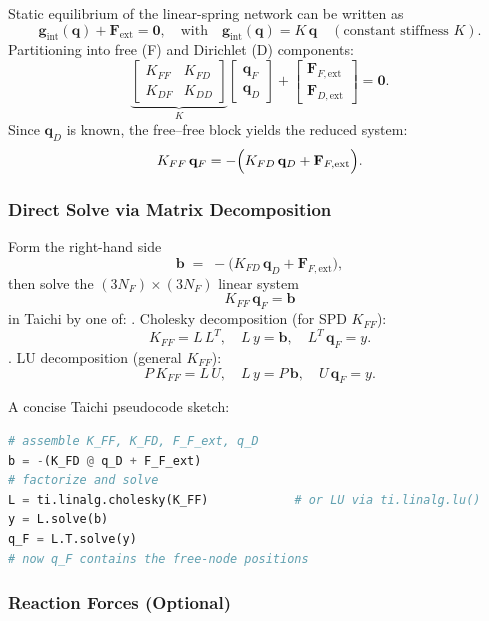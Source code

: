 \documentclass{article}
\begin{document}
Static equilibrium of the linear-spring network can be written as
\[
  \mathbf g_{\mathrm{int}}(\mathbf q) + \mathbf F_{\mathrm{ext}} = \mathbf 0,
  \quad\text{with}\quad
  \mathbf g_{\mathrm{int}}(\mathbf q) = K\,\mathbf q
  \quad(\text{constant stiffness }K).
\]
Partitioning into free (F) and Dirichlet (D) components:
\[
  \underbrace{
    \begin{bmatrix}
      K_{FF} & K_{FD}\\[4pt]
      K_{DF} & K_{DD}
    \end{bmatrix}
  }_{K}
  \begin{bmatrix}
    \mathbf q_F\\[4pt]
    \mathbf q_D
  \end{bmatrix}
  +
  \begin{bmatrix}
    \mathbf F_{F,\mathrm{ext}}\\[4pt]
    \mathbf F_{D,\mathrm{ext}}
  \end{bmatrix}
  = \mathbf 0.
\]
Since \(\mathbf q_D\) is known, the free–free block yields the reduced system:
\[
  K_{FF}\,\mathbf q_F
  = -\Bigl(K_{FD}\,\mathbf q_D + \mathbf F_{F,\mathrm{ext}}\Bigr).
\]

\subsubsection{Direct Solve via Matrix Decomposition}

Form the right-hand side
\[
  \mathbf b \;=\; -\bigl(K_{FD}\,\mathbf q_D + \mathbf F_{F,\mathrm{ext}}\bigr),
\]
then solve the \((3N_F)\times(3N_F)\) linear system
\[
  K_{FF}\,\mathbf q_F = \mathbf b
\]
in Taichi by one of:
. Cholesky decomposition (for SPD \(K_{FF}\)):
   \[
     K_{FF} = L\,L^T,\quad
     L\,y = \mathbf b,\quad
     L^T\,\mathbf q_F = y.
   \]
. LU decomposition (general \(K_{FF}\)):
   \[
     P\,K_{FF} = L\,U,\quad
     L\,y = P\,\mathbf b,\quad
     U\,\mathbf q_F = y.
   \]

\noindent
A concise Taichi pseudocode sketch:
\begin{lstlisting}[language=Python]
# assemble K_FF, K_FD, F_F_ext, q_D
b = -(K_FD @ q_D + F_F_ext)
# factorize and solve
L = ti.linalg.cholesky(K_FF)            # or LU via ti.linalg.lu()
y = L.solve(b)
q_F = L.T.solve(y)
# now q_F contains the free-node positions
\end{lstlisting}

\subsubsection{Reaction Forces (Optional)}
\end{document}
